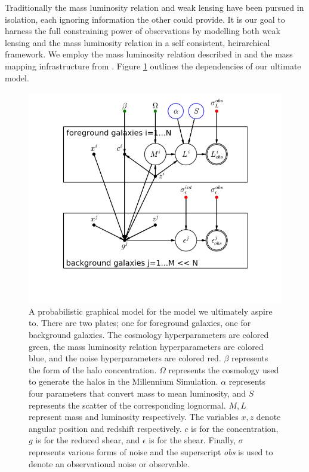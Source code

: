 \documentclass[\docopts]{\docclass}
\begin{document}
Traditionally the mass luminosity relation and weak lensing have been pursued in isolation, each ignoring information the other could provide. 
It is our goal to harness the full constraining power of observations by modelling both weak lensing and the mass luminosity relation in a self consistent, heirarchical framework.
We employ the mass luminosity relation described in \citet{reddick} and the mass mapping infrastructure from 
\citet{components}. 
Figure \ref{fig:ultimate_pgm} outlines the dependencies of our ultimate model.

\begin{figure}[h]
\centering
\includegraphics[width=0.9\columnwidth]{ultimate_pgm.png}
\caption{
A probabilistic graphical model for the model we ultimately aspire to. 
There are two plates; one for foreground galaxies, one for background galaxies. 
The cosmology hyperparameters are colored green, the mass luminosity relation hyperparameters are colored blue, and the noise hyperparameters are colored red. 
$\beta$ represents the form of the halo concentration.
$\Omega$ represents the cosmology used to generate the halos in the Millennium Simulation.
$\alpha$ represents four parameters that convert mass to mean luminosity, and $S$ represents the scatter of the corresponding lognormal.
$M,L$ represent mass and luminosity respectively. 
The variables $x,z$ denote angular position and redshift respectively.
$c$ is for the concentration, $g$ is for the reduced shear, and $\epsilon$ is for the shear.
Finally, $\sigma$ represents various forms of noise and the superscript \emph{obs} is used to denote an observational noise or observable. 
\label{fig:ultimate_pgm}}
\end{figure}
\end{document}
